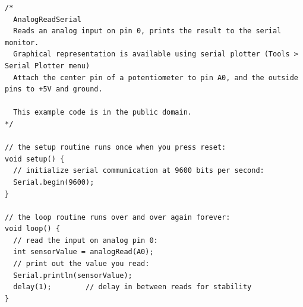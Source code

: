 \documentclass{arduino}
\begin{document}
\begin{minipage}{\widemargin}
\begin{lstlisting}
/*
  AnalogReadSerial
  Reads an analog input on pin 0, prints the result to the serial monitor.
  Graphical representation is available using serial plotter (Tools > Serial Plotter menu)
  Attach the center pin of a potentiometer to pin A0, and the outside pins to +5V and ground.

  This example code is in the public domain.
*/

// the setup routine runs once when you press reset:
void setup() {
  // initialize serial communication at 9600 bits per second:
  Serial.begin(9600);
}

// the loop routine runs over and over again forever:
void loop() {
  // read the input on analog pin 0:
  int sensorValue = analogRead(A0);
  // print out the value you read:
  Serial.println(sensorValue);
  delay(1);        // delay in between reads for stability
}
\end{lstlisting}
\end{minipage}
\end{document}
